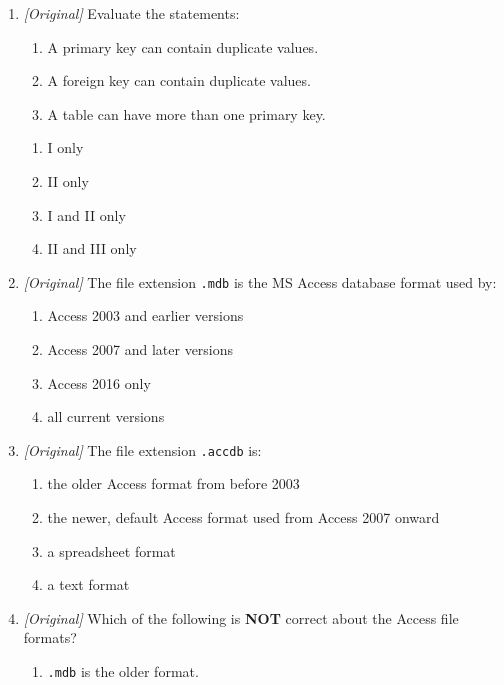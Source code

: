 \documentclass[11pt]{article}
\begin{document}
\begin{enumerate}[label=\textbf{Q\arabic*.}, leftmargin=*]
\begin{enumerate}[label=\Alph*.]
    \item Cascade Update
    \item Cascade Delete
    \item Referential integrity
    \item Composite key
  \end{enumerate}
\item \textit{[Original]} Evaluate the statements:
  \begin{enumerate}[label=\Roman*.]
    \item A primary key can contain duplicate values.
    \item A foreign key can contain duplicate values.
    \item A table can have more than one primary key.
  \end{enumerate}
  \begin{enumerate}[label=\Alph*.]
    \item I only
    \item II only
    \item I and II only
    \item II and III only
  \end{enumerate}
\item \textit{[Original]} The file extension \texttt{.mdb} is the MS Access
  database format used by:
  \begin{enumerate}[label=\Alph*.]
    \item Access 2003 and earlier versions
    \item Access 2007 and later versions
    \item Access 2016 only
    \item all current versions
  \end{enumerate}
\item \textit{[Original]} The file extension \texttt{.accdb} is:
  \begin{enumerate}[label=\Alph*.]
    \item the older Access format from before 2003
    \item the newer, default Access format used from Access 2007 onward
    \item a spreadsheet format
    \item a text format
  \end{enumerate}
\item \textit{[Original]} Which of the following is \textbf{NOT} correct about
  the Access file formats?
  \begin{enumerate}[label=\Alph*.]
    \item \texttt{.mdb} is the older format.

\end{enumerate}
\end{enumerate}
\end{document}

